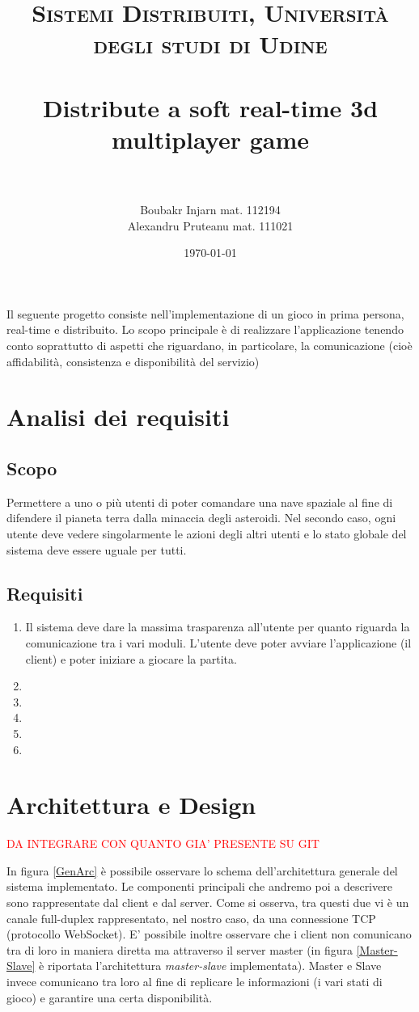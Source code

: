 \documentclass[paper=a4, fontsize=11pt]{scrartcl} %
\title{	
\normalfont \normalsize 
\textsc{Sistemi Distribuiti, Università degli studi di Udine} \\ [25pt] %
\horrule{0.5pt} \\[0.4cm] %
\huge Distribute a soft real-time 3d multiplayer game\\%
\horrule{2pt} \\[0.5cm] %
}
\author{Boubakr Injarn mat. 112194\\Alexandru Pruteanu mat. 111021} %
\date{\normalsize\today} %
\numberwithin{equation}{section} %
\numberwithin{figure}{section} %
\numberwithin{table}{section} %
\begin{document}
\maketitle %
\newpage
\tableofcontents
\listoffigures
\newpage
\textbf{\abstractname}

Il seguente progetto consiste nell'implementazione di un gioco in prima persona,
real-time e distribuito. Lo scopo principale è di realizzare l'applicazione tenendo
conto soprattutto di aspetti che riguardano, in particolare, la comunicazione
(cioè affidabilità, consistenza e disponibilità del servizio)

\section{Analisi dei requisiti}
\subsection{Scopo}
Permettere a uno o più utenti di poter comandare una nave spaziale al fine di difendere il pianeta terra dalla minaccia degli asteroidi. Nel secondo caso, ogni utente deve vedere singolarmente le azioni degli altri utenti e lo stato globale del sistema deve essere uguale per tutti.
\subsection{Requisiti}
\begin{enumerate}
\item Il sistema deve dare la massima trasparenza all'utente per quanto riguarda la comunicazione tra i vari moduli. L'utente deve poter avviare l'applicazione (il client) e poter iniziare a giocare la partita.
\item 
\item
\item
\item
\item
\end{enumerate}

\section{Architettura e Design}
\textcolor{red}{DA INTEGRARE CON QUANTO GIA' PRESENTE SU GIT}

In figura \ref{GenArc} è possibile osservare lo schema dell'architettura generale del sistema implementato. Le componenti principali che andremo poi a descrivere sono rappresentate dal client e dal server. Come si osserva, tra questi due vi è un canale full-duplex rappresentato, nel nostro caso, da una connessione TCP (protocollo WebSocket). E' possibile inoltre osservare che i client non comunicano tra di loro in maniera diretta ma attraverso il server master (in figura \ref{Master-Slave} è riportata l'architettura \textit{master-slave} implementata). Master e Slave invece comunicano tra loro al fine di replicare le informazioni (i vari stati di gioco) e garantire una certa disponibilità.
\end{document}
